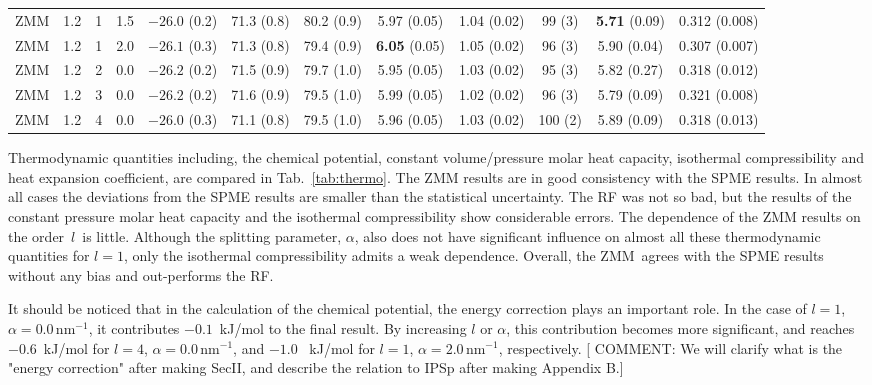 \documentclass[a4paper,preprint,unsortedaddress,onecolumn,fleqn]{revtex4}
\begin{document}
\begin{sidewaystable}
\begin{tabular*}{0.99\textwidth}{@{\extracolsep{\fill}}cccc cccccccc}
    ZMM          &1.2 & 1  &1.5 & $-26.0$ (0.2) & 71.3 (0.8)  &80.2 (0.9)           & 5.97 (0.05)               &1.04 (0.02)          & 99 (3)          & \textbf{5.71} (0.09)&        {0.312} (0.008)\\ 
    ZMM          &1.2 & 1  &2.0 & $-26.1$ (0.3) & 71.3 (0.8)  &79.4 (0.9)           & \textbf{6.05} (0.05)      &1.05 (0.02)          & 96 (3)          &        {5.90} (0.04)&        {0.307} (0.007)\\\hline
    ZMM          &1.2 & 2  &0.0 & $-26.2$ (0.2) & 71.5 (0.9)  &79.7 (1.0)           & 5.95 (0.05)               &1.03 (0.02)          & 95 (3)          &         5.82  (0.27)&         0.318  (0.012)\\
    ZMM          &1.2 & 3  &0.0 & $-26.2$ (0.2) & 71.6 (0.9)  &79.5 (1.0)           & 5.99 (0.05)               &1.02 (0.02)          & 96 (3)          &         5.79  (0.09)&         0.321  (0.008)\\
    ZMM          &1.2 & 4  &0.0 & $-26.0$ (0.3) & 71.1 (0.8)  &79.5 (1.0)           & 5.96 (0.05)               &1.03 (0.02)          &100 (2)          &         5.89  (0.09)&         0.318  (0.013)\\
    \hline\hline
  \end{tabular*}
  \label{tab:thermo}
\end{sidewaystable}

Thermodynamic quantities including, the chemical potential, constant
volume/pressure molar heat capacity, isothermal compressibility and heat
expansion coefficient, are compared in Tab.~\ref{tab:thermo}. The ZMM results
are in good consistency with the SPME results. In almost all cases the
deviations from the SPME results are smaller than the statistical
uncertainty. The RF was not so bad, but the results of the constant pressure
molar heat capacity and the isothermal compressibility show considerable
errors. The dependence of the ZMM results on the order\ $l$\ is little.
Although the splitting parameter, $\alpha $, also does not have significant
influence on almost all these thermodynamic quantities for $l=1$, only the
isothermal compressibility admits a weak dependence. Overall, the ZMM\ agrees
with the SPME results without any bias and out-performs the RF.

It should be noticed that in the calculation of the chemical potential, the
energy correction plays an important role. In the case of $l=1$, $\alpha
=0.0\,\text{nm}^{-1}$, it contributes $-0.1$~kJ/mol to the final result. By
increasing $l$ or $\alpha $, this contribution becomes more significant, and
reaches $-0.6$~kJ/mol for $l=4$, $\alpha =0.0\,\text{nm}^{-1}$, and $-1.0$%
~kJ/mol for $l=1$, $\alpha =2.0\,\text{nm}^{-1}$, respectively. [{%
\color{blue}COMMENT: We will clarify what is the "energy correction" after
making SecII, and describe the relation to IPSp after making Appendix B.}]
\end{document}

